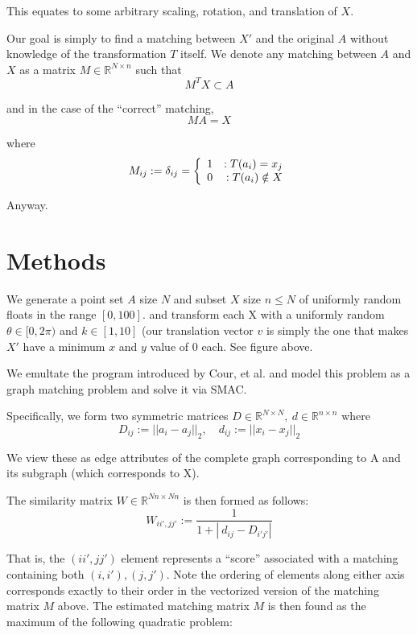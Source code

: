 \documentclass[10pt,twocolumn]{article}
\providecommand{\R}{\mathbb{R}}%
\begin{document}
{This equates to some arbitrary scaling, rotation, and translation of $X$.

Our goal is simply to find a matching between $X'$ and the original $A$ without
knowledge of the transformation $T$ itself. We denote any matching between $A$
and $X$ as a matrix $M \in \R^{N\times n}$ such that
\[
  M^T X \subset A 
\]

and in the case of the ``correct'' matching,
\begin{equation}
  MA = X
\end{equation}

where
\begin{equation}
  M_{ij} := \delta_{ij} \\
  = \left\{
    \begin{array}{lr}
    1 &: T(a_i) = x_j  \\
    0 &: T(a_i) \notin X
  \end{array}
  \right.
\end{equation}

Anyway.

\section{Methods}
We generate a point set $A$ size $N$ and subset $X$ size $n\leq N$ of uniformly
random floats in the range $[0,100]$. and transform each X with a uniformly
random $\theta \in [0, 2\pi)$ and $k\in [1,10]$ (our translation vector $v$ is
simply the one that makes $X'$ have a minimum $x$ and $y$ value of 0 each. See figure above.

We emultate the program introduced by Cour, et al.\cite{c02} and model
this problem as a graph matching problem and solve it via SMAC.

Specifically, we form two symmetric matrices
$D\in\R^{N \times N} , \ d\in\R^{n \times n}$ where
\[
  D_{ij} := || a_i - a_j ||_2 ,  \quad d_{ij} := || x_i - x_j ||_2
\]

We view these as edge attributes of the complete graph corresponding to A and its subgraph (which corresponds to X).

The similarity matrix $W \in \R^{Nn \times Nn}$ is then formed as follows:
\[
  W_{ii',jj'} := \frac{1}{1 + \left| \  d_{ij} - D_{i'j'}  \right| }
\]

That is, the $(ii',jj')$ element represents a ``score'' associated with a
matching containing both $(i,i'),(j,j')$. Note the ordering of elements along
either axis corresponds exactly to their order in the vectorized version of the
matching matrix $M$ above. The estimated matching matrix $M$ is then found as the
maximum of the following quadratic problem:

}
\end{document}
